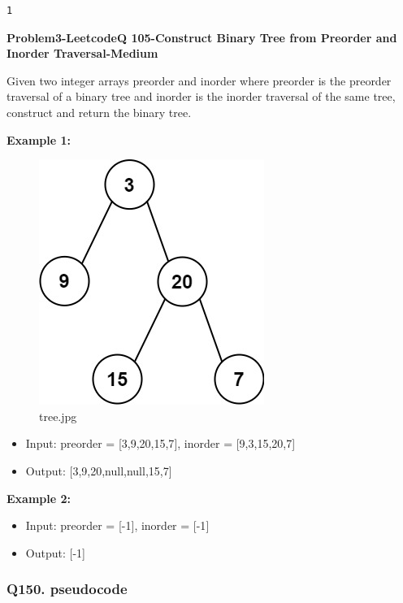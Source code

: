 \documentclass[11pt]{article}
\providecommand{\tightlist}{%
      \setlength{\itemsep}{0pt}\setlength{\parskip}{0pt}}
\begin{document}
    \begin{Verbatim}[commandchars=\\\{\}]
1
    \end{Verbatim}

    \textbf{Problem3-LeetcodeQ 105-Construct Binary Tree from Preorder and
Inorder Traversal-Medium}

Given two integer arrays preorder and inorder where preorder is the
preorder traversal of a binary tree and inorder is the inorder traversal
of the same tree, construct and return the binary tree.

\textbf{Example 1:}

\begin{figure}
\centering
\includegraphics{0d9e8e38-5da2-4a3b-8a53-ee74e83c7ee5.jpg}
\caption{tree.jpg}
\end{figure}

\begin{itemize}
\tightlist
\item
  Input: preorder = {[}3,9,20,15,7{]}, inorder = {[}9,3,15,20,7{]}
\item
  Output: {[}3,9,20,null,null,15,7{]}
\end{itemize}

\textbf{Example 2:}

\begin{itemize}
\tightlist
\item
  Input: preorder = {[}-1{]}, inorder = {[}-1{]}
\item
  Output: {[}-1{]}
\end{itemize}

    \subsubsection{Q150. pseudocode}\label{q150.-pseudocode}
\end{document}
